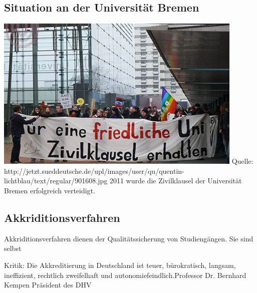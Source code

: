 \subsection*{Situation an der Universität Bremen}
\begin{frame}
\includegraphics[scale=0.5]{images/zivilklausel.jpg}
Quelle: http://jetzt.sueddeutsche.de/upl/images/user/qu/quentin-lichtblau/text/regular/901608.jpg
2011 wurde die Zivilklausel der Universität Bremen erfolgreich verteidigt.
\end{frame}

\subsection*{Akkriditionsverfahren}
\begin{frame}
Akkriditionsverfahren dienen der Qualitätssicherung von Studiengängen. Sie sind selbst
\end{frame}

\begin{frame}
Kritik:
\glqq Die Akkreditierung in Deutschland ist teuer, bürokratisch, langsam, ineffizient, rechtlich zweifelhaft und autonomiefeindlich.\grqq Professor Dr. Bernhard Kempen Präsident des DHV
\end{frame}
